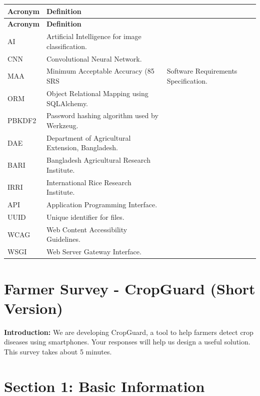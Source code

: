 \documentclass[12pt,a4paper]{article}
\begin{document}
\begin{longtable}{|p{2cm}|p{12cm}|}
\hline
{}
\textbf{Acronym} & \textbf{Definition} \\
\hline
\endfirsthead
\hline
{}
\textbf{Acronym} & \textbf{Definition} \\
\hline
\endhead

AI & Artificial Intelligence for image classification. \\
\hline
CNN & Convolutional Neural Network. \\
\hline
MAA & Minimum Acceptable Accuracy (85%
\hline
SRS & Software Requirements Specification. \\
\hline
ORM & Object Relational Mapping using SQLAlchemy. \\
\hline
PBKDF2 & Password hashing algorithm used by Werkzeug. \\
\hline
DAE & Department of Agricultural Extension, Bangladesh. \\
\hline
BARI & Bangladesh Agricultural Research Institute. \\
\hline
IRRI & International Rice Research Institute. \\
\hline
API & Application Programming Interface. \\
\hline
UUID & Unique identifier for files. \\
\hline
WCAG & Web Content Accessibility Guidelines. \\
\hline
WSGI & Web Server Gateway Interface. \\
\hline

\end{longtable}
\section*{Farmer Survey - CropGuard (Short Version)}

\textbf{Introduction:} We are developing CropGuard, a tool to help farmers detect crop diseases using smartphones. Your responses will help us design a useful solution. This survey takes about 5 minutes.

\section*{Section 1: Basic Information}
\end{document}
